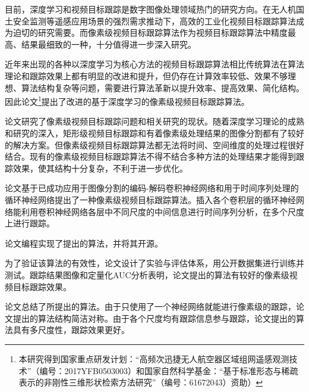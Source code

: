 
\begin{cabstract}
	目前，深度学习和视频目标跟踪是数字图像处理领域热门的研究方向。在无人机国土安全监测等遥感应用场景的强烈需求推动下，高效的工业化视频目标跟踪算法成为迫切的研究需要。而像素级视频目标跟踪算法作为视频目标跟踪算法中精度最高、结果最细致的一种，十分值得进一步深入研究。
	\par
	近年来出现的各种以深度学习为核心方法的视频目标跟踪算法相比传统算法在算法理论和跟踪效果上都有明显的改进和提升，但仍存在计算效率较低、效果不够理想、算法结构复杂等问题，需要进行算法革新以提升效率、提高效果、简化结构。因此论文\footnote{本研究得到国家重点研发计划：“高频次迅捷无人航空器区域组网遥感观测技术”（编号：2017YFB0503003）和国家自然科学基金：“基于标准形态与稀疏表示的非刚性三维形状检索方法研究”（编号：61672043）资助）}提出了改进的基于深度学习的像素级视频目标跟踪算法。
	\par
	论文研究了像素级视频目标跟踪问题和相关研究的现状。随着深度学习理论的成熟和研究的深入，矩形级视频目标跟踪和有着像素级处理结果的图像分割都有了较好的解决方案。但像素级视频目标跟踪算法都无法将时间、空间维度的处理过程很好结合。现有的像素级视频目标跟踪算法不得不结合多种方法的处理结果才能得到跟踪效果，使其结构十分复杂，不利于进一步优化。
	\par
	论文基于已成功应用于图像分割的编码-解码卷积神经网络和用于时间序列处理的循环神经网络提出了一种像素级视频目标跟踪算法。插入各个卷积层的循环神经网络能利用卷积神经网络各层中不同尺度的中间信息进行时间序列分析，在多个尺度上进行跟踪。
	\par
	论文编程实现了提出的算法，并将其开源。
	\par
	为了验证该算法的有效性，论文设计了实验与评估体系，用公开数据集进行训练并测试。跟踪结果图像和定量化AUC分析表明，论文提出的算法有较好的像素级视频目标跟踪效果。
	\par
	论文总结了所提出的算法。由于只使用了一个神经网络就能进行像素级的跟踪，论文提出的算法结构简洁对称。由于各个尺度均有跟踪信息参与跟踪，论文提出的算法具有多尺度性，跟踪效果更好。
\end{cabstract}

